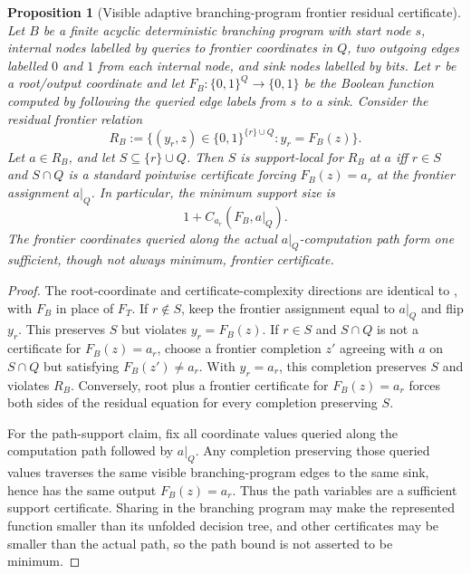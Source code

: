 \documentclass[11pt]{article}
\newtheorem{proposition}[theorem]{Proposition}
\theoremstyle{definition}
\newcommand{\bits}{\{0,1\}}
\begin{document}
\begin{proposition}[Visible adaptive branching-program frontier residual certificate]\label{prop:visible-adaptive-branching-frontier-residual}
Let \(B\) be a finite acyclic deterministic branching program with start node \(s\), internal nodes labelled by queries to frontier coordinates in \(Q\), two outgoing edges labelled \(0\) and \(1\) from each internal node, and sink nodes labelled by bits.  Let \(r\) be a root/output coordinate and let \(F_B:\bits^Q\to\bits\) be the Boolean function computed by following the queried edge labels from \(s\) to a sink.  Consider the residual frontier relation
\[
  R_B
  :=
  \{(y_r,z)\in\bits^{\{r\}\cup Q}: y_r=F_B(z)\}.
\]
Let \(a\in R_B\), and let \(S\subseteq\{r\}\cup Q\).  Then \(S\) is support-local for \(R_B\) at \(a\) iff \(r\in S\) and \(S\cap Q\) is a standard pointwise certificate forcing \(F_B(z)=a_r\) at the frontier assignment \(a|_Q\).  In particular, the minimum support size is
\[
  1+C_{a_r}(F_B,a|_Q).
\]
The frontier coordinates queried along the actual \(a|_Q\)-computation path form one sufficient, though not always minimum, frontier certificate.
\end{proposition}

\begin{proof}
The root-coordinate and certificate-complexity directions are identical to , with \(F_B\) in place of \(F_T\).  If \(r\notin S\), keep the frontier assignment equal to \(a|_Q\) and flip \(y_r\).  This preserves \(S\) but violates \(y_r=F_B(z)\).  If \(r\in S\) and \(S\cap Q\) is not a certificate for \(F_B(z)=a_r\), choose a frontier completion \(z'\) agreeing with \(a\) on \(S\cap Q\) but satisfying \(F_B(z')\ne a_r\).  With \(y_r=a_r\), this completion preserves \(S\) and violates \(R_B\).  Conversely, root plus a frontier certificate for \(F_B(z)=a_r\) forces both sides of the residual equation for every completion preserving \(S\).

For the path-support claim, fix all coordinate values queried along the computation path followed by \(a|_Q\).  Any completion preserving those queried values traverses the same visible branching-program edges to the same sink, hence has the same output \(F_B(z)=a_r\).  Thus the path variables are a sufficient support certificate.  Sharing in the branching program may make the represented function smaller than its unfolded decision tree, and other certificates may be smaller than the actual path, so the path bound is not asserted to be minimum.
\end{proof}
\end{document}

